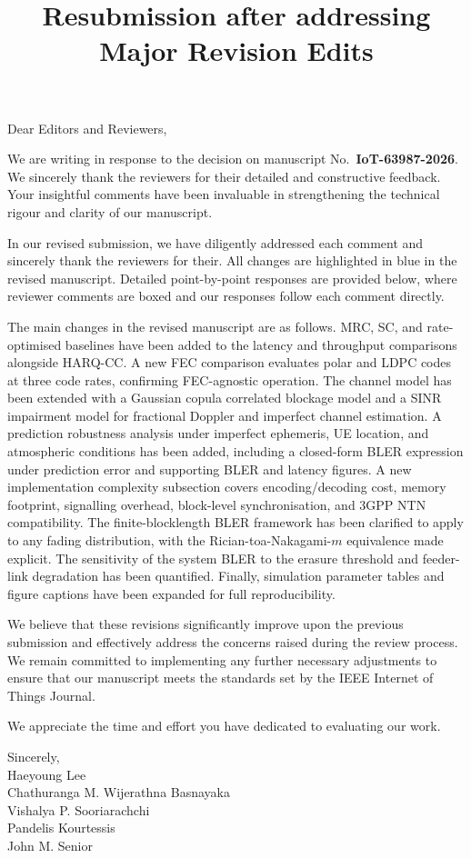 
\title{Resubmission after addressing Major Revision Edits}
\vskip 0.2in

\noindent Dear Editors and Reviewers,

\vskip 0.1in

We are writing in response to the decision on manuscript No.\ \textbf{IoT-63987-2026}. We sincerely thank the reviewers for their detailed and constructive feedback. Your insightful comments have been invaluable in strengthening the technical rigour and clarity of our manuscript.

In our revised submission, we have diligently addressed each comment and sincerely thank the reviewers for their. All changes are highlighted in {\color{blue}blue} in the revised manuscript. Detailed point-by-point responses are provided below, where reviewer comments are boxed and our responses follow each comment directly.

The main changes in the revised manuscript are as follows. MRC, SC, and rate-optimised baselines have been added to the latency and throughput comparisons alongside HARQ-CC. A new FEC comparison evaluates polar and LDPC codes at three code rates, confirming FEC-agnostic operation. The channel model has been extended with a Gaussian copula correlated blockage model and a SINR impairment model for fractional Doppler and imperfect channel estimation. A prediction robustness analysis under imperfect ephemeris, UE location, and atmospheric conditions has been added, including a closed-form BLER expression under prediction error and supporting BLER and latency figures. A new implementation complexity subsection covers encoding/decoding cost, memory footprint, signalling overhead, block-level synchronisation, and 3GPP NTN compatibility. The finite-blocklength BLER framework has been clarified to apply to any fading distribution, with the Rician-toa-Nakagami-$m$ equivalence made explicit. The sensitivity of the system BLER to the erasure threshold and feeder-link degradation has been quantified. Finally, simulation parameter tables and figure captions have been expanded for full reproducibility.

We believe that these revisions significantly improve upon the previous submission and effectively address the concerns raised during the review process. We remain committed to implementing any further necessary adjustments to ensure that our manuscript meets the standards set by the IEEE Internet of Things Journal.

We appreciate the time and effort you have dedicated to evaluating our work. 

\vskip 0.2in

\noindent Sincerely, \\
\large Haeyoung Lee \\
\large Chathuranga M. Wijerathna Basnayaka \\
\large Vishalya P. Sooriarachchi \\
\large Pandelis Kourtessis \\
\large John M. Senior

